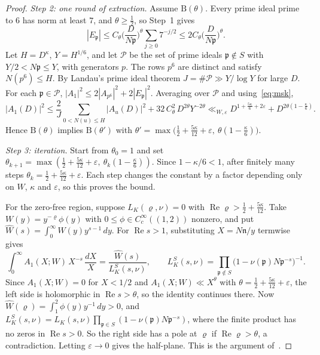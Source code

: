 \documentclass[11pt]{article}
\theoremstyle{remark}
\begin{document}
\begin{proof}
\emph{Step 2: one round of extraction.} Assume $\mathrm B(\theta)$. Every prime ideal prime
to $6$ has norm at least $7$, and $\theta\ge\frac12$, so Step~1 gives
\[
|E_{\mathfrak p}|\le C_\theta\Big(\frac D{N\mathfrak p}\Big)^{\theta}
\sum_{j\ge0}7^{-j/2}\le2C_\theta\Big(\frac D{N\mathfrak p}\Big)^{\theta}.
\]
Let $H=D^\kappa$, $Y=H^{1/6}$, and let $\mathcal P$ be the set of prime ideals
$\mathfrak p\notin S$ with $Y/2<N\mathfrak p\le Y$, with generators $p$. The rows $p^6$ are
distinct and satisfy $N(p^6)\le H$. By Landau's prime ideal theorem
$J=\#\mathcal P\gg Y/\log Y$ for large $D$. For each $\mathfrak p\in\mathcal P$,
$|A_1|^2\le2|A_{p^6}|^2+2|E_{\mathfrak p}|^2$. Averaging over $\mathcal P$ and
using~\eqref{eq:msk},
\[
|A_1(D)|^2\le\frac2J\sum_{0<N(u)\le H}|A_u(D)|^2+32\,C_\theta^2\,D^{2\theta}Y^{-2\theta}
\ll_{W,\varepsilon}D^{1+\frac{5\kappa}6+2\varepsilon}+D^{2\theta(1-\frac\kappa6)}.
\]
Hence $\mathrm B(\theta)$ implies $\mathrm B(\theta')$ with
$\theta'=\max\big(\tfrac12+\tfrac{5\kappa}{12}+\varepsilon,\ \theta(1-\tfrac\kappa6)\big)$.

\emph{Step 3: iteration.} Start from $\theta_0=1$ and set
$\theta_{k+1}=\max(\frac12+\frac{5\kappa}{12}+\varepsilon,\ \theta_k(1-\frac\kappa6))$. Since
$1-\kappa/6<1$, after finitely many steps $\theta_k=\frac12+\frac{5\kappa}{12}+\varepsilon$.
Each step changes the constant by a factor depending only on $W$, $\kappa$ and $\varepsilon$,
so this proves the bound.

For the zero-free region, suppose $L_K(\varrho,\nu)=0$ with
$\operatorname{Re}\varrho>\frac12+\frac{5\kappa}{12}$. Take $W(y)=y^{-\varrho}\phi(y)$ with
$0\le\phi\in C_c^\infty((1,2))$ nonzero, and put $\widehat W(s)=\int_0^\infty W(y)y^{s-1}\,dy$.
For $\operatorname{Re}s>1$, substituting $X=N\mathfrak n/y$ termwise gives
\[
\int_0^\infty A_1(X;W)\,X^{-s}\,\frac{dX}{X}=\frac{\widehat W(s)}{L_K^S(s,\nu)},\qquad
L_K^S(s,\nu)=\prod_{\mathfrak p\notin S}\big(1-\nu(\mathfrak p)N\mathfrak p^{-s}\big)^{-1}.
\]
Since $A_1(X;W)=0$ for $X<1/2$ and $A_1(X;W)\ll X^{\theta}$ with
$\theta=\frac12+\frac{5\kappa}{12}+\varepsilon$, the left side is holomorphic in
$\operatorname{Re}s>\theta$, so the identity continues there. Now
$\widehat W(\varrho)=\int_1^2\phi(y)y^{-1}\,dy>0$, and
$L_K^S(s,\nu)=L_K(s,\nu)\prod_{\mathfrak p\in S}(1-\nu(\mathfrak p)N\mathfrak p^{-s})$, where the
finite product has no zeros in $\operatorname{Re}s>0$. So the right side has a pole at
$\varrho$ if $\operatorname{Re}\varrho>\theta$, a contradiction. Letting $\varepsilon\to0$ gives
the half-plane. This is the argument of~\cite[Sec.~3]{OAI}.
\end{proof}
\end{document}
